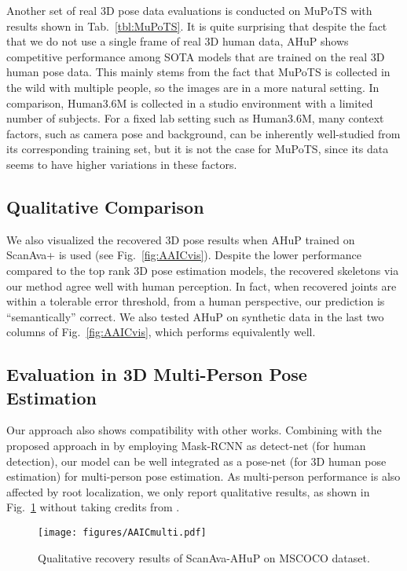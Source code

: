 \documentclass[twocolumn]{svjour3}          \smartqed  \usepackage{graphicx}
\newcommand{\figref}[1]{Fig.~\ref{#1}}
\newcommand{\tabref}[1]{Tab.~\ref{#1}}
\newcommand{\figAAICmulti}{
\begin{figure}[h]
    \centering
    \texttt{[image: figures/AAICmulti.pdf]}
    \caption{Qualitative recovery results of ScanAva-AHuP on MSCOCO dataset.}
    \label{fig:AAICmulti}
     \vspace{-.25in}
\end{figure}
}
\begin{document}
Another set of real 3D pose data evaluations is conducted on MuPoTS \cite{singleshotmultiperson2018} with results shown in \tabref{tbl:MuPoTS}. It is quite surprising that despite the fact that we do not use a single frame of real 3D human data, AHuP shows competitive performance among SOTA models that are trained on the  real 3D human pose data.  
This mainly stems from the fact that MuPoTS is collected in the wild with multiple people, so the images are in a more natural setting. In comparison, Human3.6M is collected in a studio environment with a limited number of subjects.
For a fixed lab setting such as Human3.6M, many context factors, such as camera pose and background, can be  inherently well-studied from its corresponding training set, but it is not the case for MuPoTS, since its data seems to have higher variations in these factors. 





\subsection{Qualitative Comparison}
We also visualized the recovered 3D pose results when AHuP trained on ScanAva+ is used (see \figref{fig:AAICvis}). Despite the lower performance compared to the top rank 3D pose estimation models, the  recovered skeletons via our method agree well with human perception. 
In fact, when recovered joints are within a tolerable error threshold, from a human perspective, our prediction is ``semantically'' correct. 
We also  tested AHuP on synthetic data in the last two columns of \figref{fig:AAICvis}, which performs equivalently well. 

\subsection{Evaluation in 3D Multi-Person Pose Estimation}
Our approach also shows compatibility with other works. Combining with the proposed approach in \cite{moon2019camera} by employing Mask-RCNN \cite{he2017mask} as detect-net (for human detection), our model can be well integrated as a pose-net (for 3D human pose estimation) for multi-person pose estimation. As multi-person performance is also affected by root localization, we only report qualitative results, as shown in \figref{fig:AAICmulti}  without taking credits from \cite{moon2019camera}. 

\figAAICmulti
\end{document}
